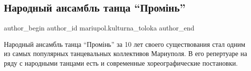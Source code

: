  
 
 
 
 

\subsection{Народный ансамбль танца \enquote{Промінь}}
\label{sec:21_01_2019.fb.mariupol.kulturna_toloka.1.narodnyj_ansambl_tanca_promin}

\ifcmt
 author_begin
   author_id mariupol.kulturna_toloka
 author_end
\fi

Народный ансамбль танца \enquote{Промінь} за 10 лет своего существования стал одним из
самых популярных танцевальных коллективов Мариуполя. В его репертуаре на ряду с
народными танцами есть и современные хореографические постановки.
